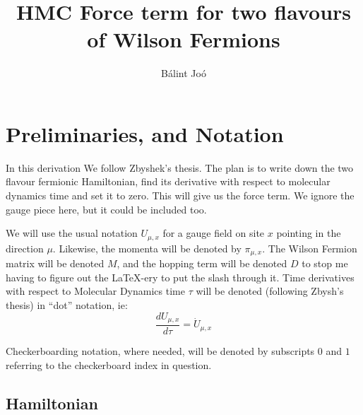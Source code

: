 \documentclass[12pt]{article}
\title{HMC Force term for two flavours of Wilson Fermions}
\author{B\'alint Jo\'o}
\begin{document}
\newcommand{\Tr}{\mbox{Tr}\ } 
\newcommand{\Trs}{\mbox{Tr}_{s} \ }
\newcommand{\Trc}{\mbox{Tr}_{c} \ }
\newcommand{\Mdag}{M^{\dagger}}
\newcommand{\Udag}{U^{\dagger}}
\newcommand{\Ddag}{D^{\dagger}}
\newcommand{\Udot}{\dot{U}}
\newcommand{\UdagDot}{\dot{U}^{\dagger}}
\newcommand{\Mdot}{\dot{M}}
\newcommand{\MdagDot}{\dot{M}^{\dagger}}
\newcommand{\Ddot}{\dot{D}}
\newcommand{\DdagDot}{\dot{D}^{\dagger}}
\newcommand{\pidot}{\dot{\pi}}
\newcommand{\Hdot}{\dot{H}}
\newcommand{\Sdot}{\dot{S}}
\newcommand{\phidag}{\phi^{\dagger}}
\newcommand{\Xdag}{X^{\dagger}}
\newcommand{\Ydag}{Y^{\dagger}}
\newcommand{\psidag}{\psi^{\dagger}}
\newcommand{\sigmadag}{\sigma^{\dagger}}
\newcommand{\rhodag}{\rho^{\dagger}}
\newcommand{\onepgm}{ (1 + \gamma_{\mu}) }
\newcommand{\onemgm}{ (1 - \gamma_{\mu}) }
\maketitle
{}

\section{Preliminaries, and Notation}
In this derivation We follow Zbyshek's thesis. The plan is to write down 
the two flavour fermionic Hamiltonian, find its derivative with respect
to molecular dynamics time and set it to zero. This will give us the force
term. We ignore the gauge piece here, but it could be included too. 

We will use the usual notation $U_{\mu,x}$ for a gauge field on site
$x$ pointing in the direction $\mu$. Likewise, the momenta will be denoted
by $\pi_{\mu,x}$. The Wilson Fermion matrix will be denoted $M$, and the
hopping term will be denoted $D$ to stop me having to figure out the 
LaTeX-ery to put the slash through it. Time derivatives with respect to 
Molecular Dynamics time $\tau$ will be denoted
(following Zbysh's thesis) in ``dot'' notation, ie:
\begin{equation}
\frac{d U_{\mu,x}}{d \tau} = \Udot_{\mu,x}
\end{equation}

Checkerboarding notation, where needed, will be denoted by subscripts
$0$ and $1$ referring to the checkerboard index in question.

\subsection{Hamiltonian}
\end{document}
